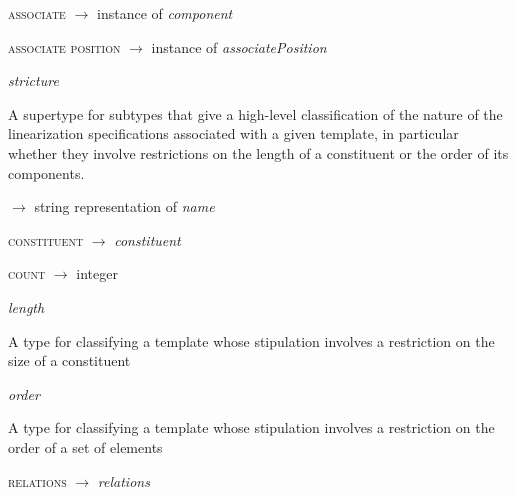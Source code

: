 \begin{ontologytop}
\begin{classlist}
		\begin{proplist}

		\item \textsc{associate} $\rightarrow$ instance of \emph{component}

		\item \textsc{associate position} $\rightarrow$ instance of \emph{associatePosition}

		\end{proplist}

	\end{classlist}

\item \emph{stricture}
\hspace{1em}\parbox[t]{\linegoal}{\footnotesize A supertype for subtypes that give a high-level classification of the nature of the linearization specifications associated with a given template, in particular whether they involve restrictions on the length of a constituent or the order of its components.}


	\begin{proplist}

	\item \textsc{\name} $\rightarrow$ string representation of \emph{name}

	\item \textsc{constituent} $\rightarrow$  \emph{constituent}

	\item \textsc{count} $\rightarrow$ {integer} \emph{}

	\end{proplist}

	\begin{classlist}

	\item \emph{length}
	\hspace{1em}\parbox[t]{\linegoal}{\footnotesize A type for classifying a template whose stipulation involves a restriction on the size of a constituent}


	\item \emph{order}
	\hspace{1em}\parbox[t]{\linegoal}{\footnotesize A type for classifying a template whose stipulation involves a restriction on the order of a set of elements}


		\begin{proplist}

		\item \textsc{relations} $\rightarrow$  \emph{relations}


\end{proplist}
\end{classlist}
\end{ontologytop}
